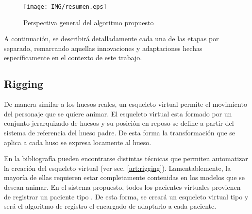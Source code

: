 \begin{figure}[!th]
   \centering
    \texttt{[image: IMG/resumen.eps]}%
    \caption{Perspectiva general del algoritmo propuesto}
		\label{fig:Resumen}
\end{figure}


%

A continuación, se describirá detalladamente cada una de las etapas por separado, remarcando aquellas innovaciones y adaptaciones hechas específicamente en el contexto de este trabajo.



\subsection{Rigging}
\label{posing:rigging}
De manera similar a los huesos reales, un esqueleto virtual permite el movimiento del personaje que se quiere animar. El esqueleto virtual esta formado por un conjunto jerarquizado de huesos y su posición en reposo se define a partir del sistema de referencia del hueso padre. De esta forma la transformación que se aplica a cada huso se expresa locamente al hueso. %



En la bibliografía pueden encontrarse distintas técnicas que permiten automatizar la creación del esqueleto virtual (ver sec. \ref{art:rigging}). Lamentablemente, la mayoría de ellas requieren estar completamente contenidas en los modelos que se desean animar. En el sistema propuesto, todos los pacientes virtuales provienen de registrar un paciente tipo .  De esta forma, se creará un esqueleto virtual tipo y será el algoritmo de registro el encargado de adaptarlo a cada paciente.  %

